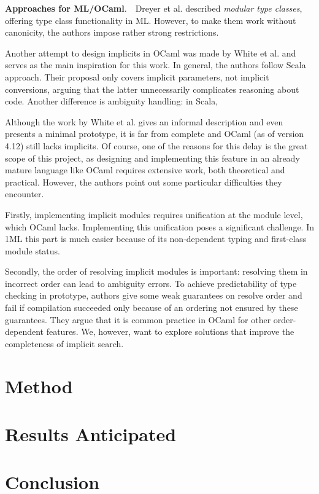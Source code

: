 \documentclass{spbau-diploma}
\begin{document}
\textbf{Approaches for ML/OCaml}.~~Dreyer et al. \cite{ml_typeclasses} described \textit{modular type classes}, offering type class functionality in ML. However, to make them work without canonicity, the authors impose rather strong restrictions. 

Another attempt to design implicits in OCaml was made by White et al. \cite{white} and serves as the main inspiration for this work. In general, the authors follow Scala approach. Their proposal only covers implicit parameters, not implicit conversions, arguing that the latter unnecessarily complicates reasoning about code. Another difference is ambiguity handling: in Scala, 

Although the work by White et al. gives an informal description and even presents a minimal prototype, it is far from complete and OCaml (as of version 4.12) still lacks implicits. Of course, one of the reasons for this delay is the great scope of this project, as designing and implementing this feature in an already mature language like OCaml requires extensive work, both theoretical and practical. However, the authors point out some particular difficulties they encounter.

Firstly, implementing implicit modules requires unification at the module level, which OCaml lacks. Implementing this unification poses a significant challenge. In 1ML this part is much easier because of its non-dependent typing and first-class module status. 

Secondly, the order of resolving implicit modules is important: resolving them in incorrect order can lead to ambiguity errors. To achieve predictability of type checking in prototype, authors give some weak guarantees on resolve order and fail if compilation succeeded only because of an ordering not ensured by these guarantees. They argue that it is common practice in OCaml for other order-dependent features. We, however, want to explore solutions that improve the completeness of implicit search.

\section{Method}

\section{Results Anticipated}

\section*{Conclusion}



\end{document}
